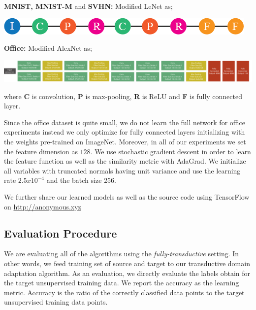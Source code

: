 \noindent \textbf{MNIST, MNIST-M} and \textbf{SVHN:} Modified LeNet\cite{lenet} as;

\includegraphics[width=\columnwidth]{lenet}


\noindent \textbf{Office:} Modified AlexNet\cite{alexnet} as;

\includegraphics[width=\columnwidth]{alexnet}


where \textbf{C} is convolution, \textbf{P} is max-pooling, \textbf{R} is ReLU and \textbf{F} is fully connected layer. 

Since the office dataset is quite small, we do not learn the full network for office experiments instead we only optimize for fully connected layers initializing with the weights  pre-trained on ImageNet. Moreover, in all of our experiments we set the feature dimension as $128$. We use stochastic gradient descent in order to learn the feature function as well as the similarity metric with AdaGrad\cite{adagrad}. We initialize all variables with truncated normals having unit variance and use the learning rate $2.5x10^{-4}$ and the batch size $256$. 



We further share our learned models as well as the source code using TensorFlow\cite{tensorflow} on \url{http://anonymous.xyz}


\subsection{Evaluation Procedure}
We are evaluating all of the algorithms using the \emph{fully-transductive} setting. In other words,  we feed training set of source and target to our transductive domain adaptation algorithm. As an evaluation, we directly evaluate the labels obtain for the target unsupervised training data. We report the accuracy as the learning metric. Accuracy is the ratio of the correctly classified data points to the target unsupervised training data points.

